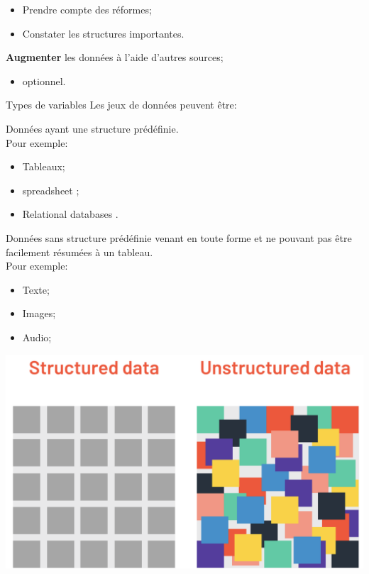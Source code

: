 \documentclass[10pt, french]{article}
\begin{document}
\begin{multicols*}{3}
\begin{algo2}
\begin{todolist}[leftmargin = *]
		\begin{itemize}[leftmargin = *]
		\item	Prendre compte des réformes;
		\item	Constater les structures importantes.
		\end{itemize}
	\item	\textbf{Augmenter} les données à l'aide d'autres sources;
		\begin{itemize}[leftmargin = *]
		\item	optionnel.
		\end{itemize}
\end{todolist}
\end{algo2}

\begin{conceptgen}{Types de variables}
Les jeux de données peuvent être:
\begin{description}[leftmargin = *]
	\item[Structuré:]	Données ayant une structure prédéfinie.\\
		Pour exemple:
		\begin{itemize}[leftmargin = *]
		\item	Tableaux;
		\item	\og spreadsheet \fg{};
		\item	\og Relational databases \fg{}.
		\end{itemize}
	\item[Non structuré:]	Données sans structure prédéfinie venant en toute forme et ne pouvant pas être facilement résumées à un tableau.\\
		Pour exemple:
		\begin{multicols*}{3}
		\begin{itemize}[leftmargin = *]
		\item	Texte;
		\item	Images;
		\item	Audio;
		\end{itemize}
		\end{multicols*}
\end{description}
\begin{center}
	\includegraphics[scale=0.15]{src/ACT-3114/data-un-structured.png}
\end{center}


\end{conceptgen}
\end{multicols*}
\end{document}
